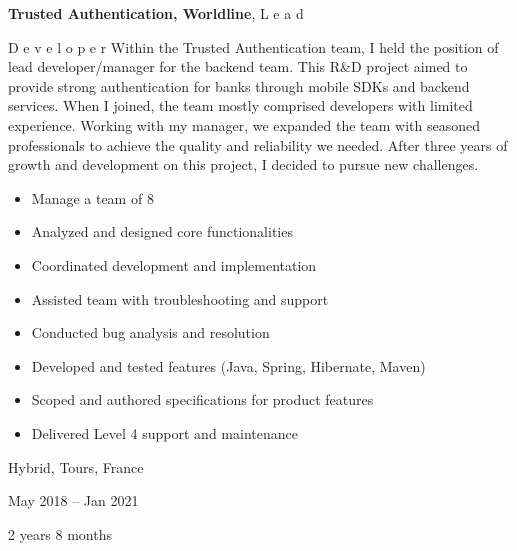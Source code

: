 \documentclass[10pt, letterpaper]{article}
\newenvironment{highlights}{
    \begin{itemize}[
        topsep=0.10 cm,
        parsep=0.10 cm,
        partopsep=0pt,
        itemsep=0pt,
        leftmargin=0.4 cm + 10pt
    ]
}{
    \end{itemize}
} %
\newenvironment{twocolentry}[2][]{
    \onecolentry
    \def\secondColumn{#2}
    \setcolumnwidth{\fill, 4.5 cm}
    \begin{paracol}{2}
}{
    \switchcolumn \raggedleft \secondColumn
    \end{paracol}
    \endonecolentry
} %
\begin{document}
        \begin{twocolentry}{
            Hybrid, Tours, France

        May 2018 – Jan 2021

        2 years 8 months
        }
            \textbf{Trusted Authentication, Worldline}, L
        e
        a
        d
         
        D
        e
        v
        e
        l
        o
        p
        e
        r 
            Within the Trusted Authentication team, I held the position of lead developer/manager for the backend team. This R\&D project aimed to provide strong authentication for banks through mobile SDKs and backend services. When I joined, the team mostly comprised developers with limited experience. Working with my manager, we expanded the team with seasoned professionals to achieve the quality and reliability we needed. After three years of growth and development on this project, I decided to pursue new challenges.
            \begin{highlights}
                \item Manage a team of 8
                \item Analyzed and designed core functionalities
                \item Coordinated development and implementation
                \item Assisted team with troubleshooting and support
                \item Conducted bug analysis and resolution
                \item Developed and tested features (Java, Spring, Hibernate, Maven)
                \item Scoped and authored specifications for product features
                \item Delivered Level 4 support and maintenance
            \end{highlights}
        \end{twocolentry}


        \vspace{0.2 cm}
\end{document}
